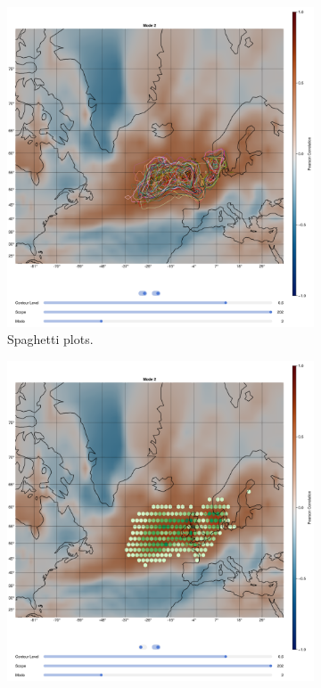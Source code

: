\begin{figure}[!htb]
  \begin{subfigure}[b]{0.49\textwidth}
    \includegraphics[width=\textwidth]{figures/ivt_pr_cor_mode2_ssp126.png}
    \caption{Spaghetti plots.}
    \label{fig:comparsion member vis spaghetti}
  \end{subfigure}
  \hfill
  \begin{subfigure}[b]{0.49\textwidth}
    \includegraphics[width=\textwidth]{figures/ivt_pr_cor_mode2_ssp126_hexbin.png}

\end{subfigure}
\end{figure}
